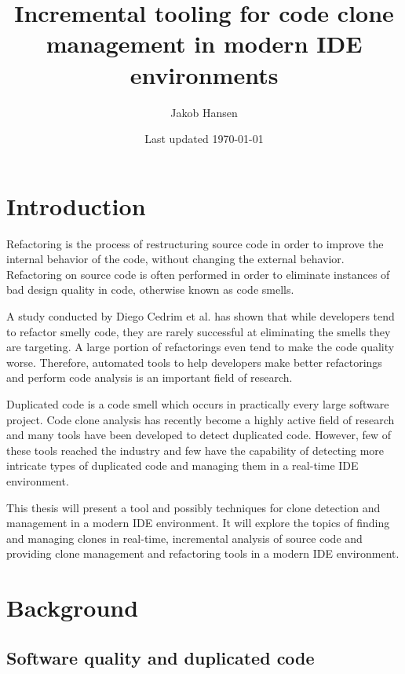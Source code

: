 \documentclass[12pt]{article}
\title{\vspace{-20px}Incremental tooling for code clone management in modern IDE environments}
\author{Jakob Hansen}
\date{Last updated \today}
\begin{document}
\maketitle


\tableofcontents

\newpage

\section{Introduction}

Refactoring is the process of restructuring source code in order to improve the internal behavior
of the code, without changing the external behavior\cite[9]{fowlerrefactoring}.
Refactoring on source code is often performed in order to eliminate instances of bad
design quality in code, otherwise known as code smells.

A study conducted by Diego Cedrim et al. has shown that while developers tend to refactor
smelly code, they are rarely successful at eliminating the smells they are
targeting\cite{Rohit_Gheyi_Impact}. A large portion of refactorings even tend to make the
code quality worse. Therefore, automated tools to help developers make better refactorings
and perform code analysis is an important field of research.

Duplicated code is a code smell which occurs in practically every large software project.
Code clone analysis has recently become a highly active field of research and many tools
have been developed to detect duplicated code\cite[7]{Inoue_introduction_to_cc}. However,
few of these tools reached the industry and few have the capability of detecting more
intricate types of duplicated code and managing them in a real-time IDE environment.

This thesis will present a tool and possibly techniques for clone detection and management
in a modern IDE environment. It will explore the topics of finding and managing clones in
real-time, incremental analysis of source code and providing clone management and
refactoring tools in a modern IDE environment.

\section{Background}

\subsection{Software quality and duplicated code}
\end{document}
